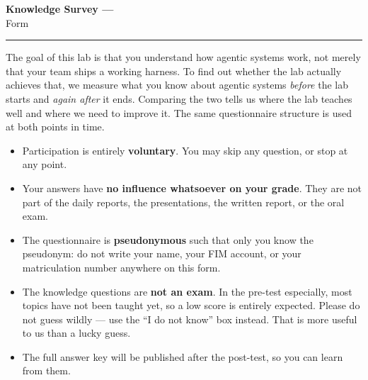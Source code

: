 
\begin{center}
  {\LARGE\bfseries \labtitle{} Knowledge Survey --- \surveywave}\\[0.6em]
  {\large Form \surveyform}\\[0.9em]
\end{center}

\noindent\rule{\linewidth}{1pt}


\noindent
The goal of this lab is that you understand how agentic systems work, not merely that your team ships a
working harness. To find out whether the lab actually achieves that, we measure what you know about
agentic systems \emph{before} the lab starts and \emph{again after} it ends. Comparing the two tells us
where the lab teaches well and where we need to improve it. The same questionnaire structure is used at
both points in time.


\begin{itemize}[leftmargin=1.4em,itemsep=0.25em,topsep=0.3em]
  \item Participation is entirely \textbf{voluntary}. You may skip any question, or stop at any point.
  \item Your answers have \textbf{no influence whatsoever on your grade}. They are not part of the daily
        reports, the presentations, the written report, or the oral exam.
  \item The questionnaire is \textbf{pseudonymous} such that only you know the pseudonym: do not write your name, your FIM account, or your matriculation
        number anywhere on this form.
  \item The knowledge questions are \textbf{not an exam}. In the pre-test especially, most topics have not been
        taught yet, so a low score is entirely expected.
        Please do not guess wildly --- use the ``I do not know'' box instead. That is more useful
        to us than a lucky guess.
  \item The full answer key will be published after the post-test, so you can learn from them.
\end{itemize}


